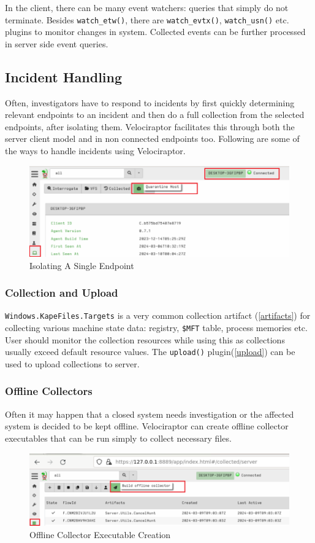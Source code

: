 \documentclass[a4paper, 11pt, oneside]{article} %
\begin{document}
In the client, there can be many event watchers: queries that simply do not terminate. Besides \verb|watch_etw()|, there are \verb|watch_evtx()|, \verb|watch_usn()| etc. plugins to monitor changes in system. Collected events can be further processed in server side event queries.
\subsection{Incident Handling}
Often, investigators have to respond to incidents by first quickly determining relevant endpoints to an incident and then do a full collection from the selected endpoints, after isolating them. Velociraptor facilitates this through both the server client model and in non connected endpoints too. Following are some of the ways to handle incidents using Velociraptor.
\begin{figure}[ht]
    \centering
    \includegraphics[width=\linewidth, center]{img/handling/quar1.png}
    \caption{Isolating A Single Endpoint}
    \label{fig:quar1}
\end{figure}

\subsubsection{Collection and Upload}
\verb|Windows.KapeFiles.Targets| is a very common collection artifact (\ref{artifacts}) for collecting various machine state data: registry, \verb|$MFT| table, process memories etc. User should monitor the collection resources while using this as collections usually exceed default resource values. The \verb|upload()| plugin(\ref{upload}) can be used to upload collections to server.

\subsubsection{Offline Collectors}
Often it may happen that a closed system needs investigation or the affected system is decided to be kept offline. Velociraptor can create offline collector executables that can be run simply to collect necessary files.
\begin{figure}[ht]
    \centering
    \includegraphics[width=\textwidth, center]{img/handling/coll1.png}
    \caption{Offline Collector Executable Creation}
    \label{fig:coll1}
\end{figure}
\end{document}

